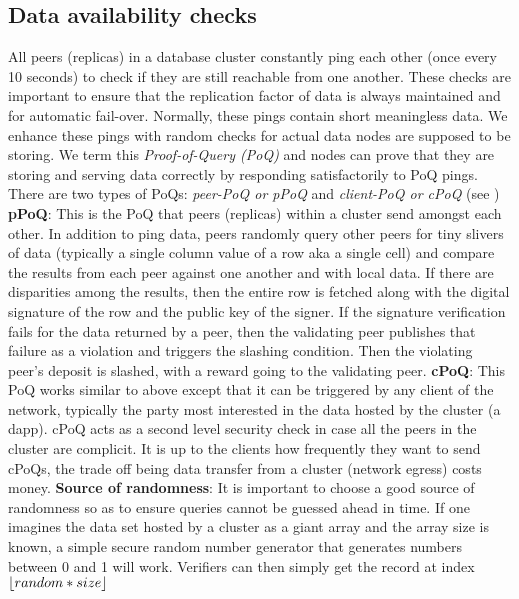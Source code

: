 \subsection{Data availability checks} \label{sec:poq}
All peers (replicas) in a database cluster constantly ping each other (once every 10 seconds) to check if they are still reachable from one another. These checks are important to ensure that the replication factor of data is always maintained and for automatic fail-over. Normally, these pings contain short meaningless data. We enhance these pings with random checks for actual data nodes are supposed to be storing. We term this \textit{Proof-of-Query (PoQ)} and nodes can prove that they are storing and serving data correctly by responding satisfactorily to PoQ pings. There are two types of PoQs: \textit{peer-PoQ or pPoQ} and \textit{client-PoQ or cPoQ} (see )
\newline
\newline
\textbf{pPoQ}: This is the PoQ that peers (replicas) within a cluster send amongst each other. In addition to ping data, peers randomly query other peers for tiny slivers of data (typically a single column value of a row aka a single cell) and compare the results from each peer against one another and with local data. If there are disparities among the results, then the entire row is fetched along with the digital signature of the row and the public key of the signer. If the signature verification fails for the data returned by a peer, then the validating peer publishes that failure as a violation and triggers the slashing condition. Then the violating peer's deposit is slashed, with a reward going to the validating peer.
\newline
\newline
\textbf{cPoQ}: This PoQ works similar to above except that it can be triggered by any client of the network, typically the party most interested in the data hosted by the cluster (a dapp). cPoQ acts as a second level security check in case all the peers in the cluster are complicit. It is up to the clients how frequently they want to send cPoQs, the trade off being data transfer from a cluster (network egress) costs money.
\newline
\newline
\textbf{Source of randomness}: It is important to choose a good source of randomness so as to ensure queries cannot be guessed ahead in time. If one imagines the data set hosted by a cluster as a giant array and the array size is known, a simple secure random number generator that generates numbers between 0 and 1 will work. Verifiers can then simply get the record at index $ \lfloor random * size\rfloor $
